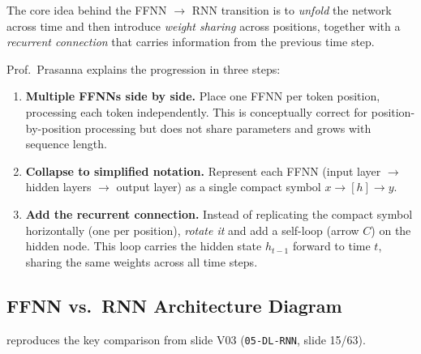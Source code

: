 \documentclass[12pt,a4paper]{article}
\begin{document}
The core idea behind the FFNN $\to$ RNN transition is to \emph{unfold} the
network across time and then introduce \emph{weight sharing} across positions,
together with a \emph{recurrent connection} that carries information from
the previous time step.

Prof.\ Prasanna explains the progression in three steps:

\begin{enumerate}[leftmargin=2em]
  \item \textbf{Multiple FFNNs side by side.} Place one FFNN per token
        position, processing each token independently.  This is conceptually
        correct for position-by-position processing but does not share
        parameters and grows with sequence length.
  \item \textbf{Collapse to simplified notation.} Represent each FFNN
        (input layer $\to$ hidden layers $\to$ output layer) as a single
        compact symbol $x \to [h] \to y$.
  \item \textbf{Add the recurrent connection.} Instead of replicating the
        compact symbol horizontally (one per position), \emph{rotate it} and
        add a self-loop (arrow $C$) on the hidden node.  This loop carries the
        hidden state $h_{t-1}$ forward to time $t$, sharing the same weights
        across all time steps.
\end{enumerate}

\subsection{FFNN vs.\ RNN Architecture Diagram}
\label{subsec:arch_diagram}

 reproduces the key comparison from slide V03
(\texttt{05-DL-RNN}, slide 15/63).
\end{document}
